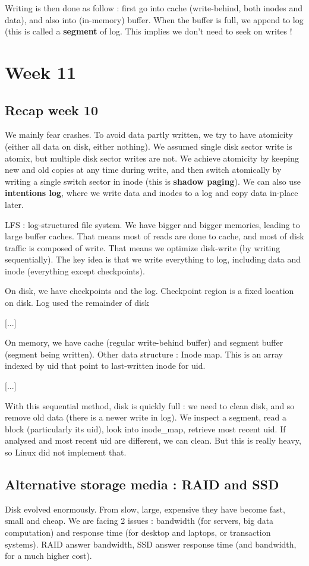 \documentclass[12pt,a4paper]{article}
\begin{document}
Writing is then done as follow : first go into cache (write-behind, both inodes and data), and also into (in-memory) buffer. When the buffer is full, we append to log (this is called a \textbf{segment} of log. This implies we don't need to seek on writes !


\section{Week 11}
\subsection{Recap week 10}
We mainly fear crashes. To avoid data partly written, we try to have atomicity (either all data on disk, either nothing). We assumed single disk sector write is atomix, but multiple disk sector writes are not. We achieve atomicity by keeping new and old copies at any time during write, and then switch atomically by writing a single switch sector in inode (this is \textbf{shadow paging}). We can also use \textbf{intentions log}, where we write data and inodes to a log and copy data in-place later. 

LFS : log-structured file system. We have bigger and bigger memories, leading to large buffer caches. That means most of reads are done to cache, and most of disk traffic is composed of write. That means we optimize disk-write (by writing sequentially). The key idea is that we write everything to log, including data and inode (everything except checkpoints). 

On disk, we have checkpoints and the log. Checkpoint region is a fixed location on disk. Log used the remainder of disk

[...]

On memory, we have cache (regular write-behind buffer) and segment buffer (segment being written). Other data structure : Inode map. This is an array indexed by uid that point to last-written inode for uid. 

[...]

With this sequential method, disk is quickly full : we need to clean disk, and so remove old data (there is a newer write in log). We inspect a segment, read a block (particularly its uid), look into inode\_map, retrieve most recent uid. If analysed and most recent uid are different, we can clean.  But this is really heavy, so Linux did not implement that. 

\subsection{Alternative storage media : RAID and SSD}
Disk evolved enormously. From slow, large, expensive they have become fast, small and cheap. We are facing 2 issues : bandwidth (for servers, big data computation) and response time (for desktop and laptops, or transaction systems). RAID answer bandwidth, SSD answer response time (and bandwidth, for a much higher cost). 
\end{document}
